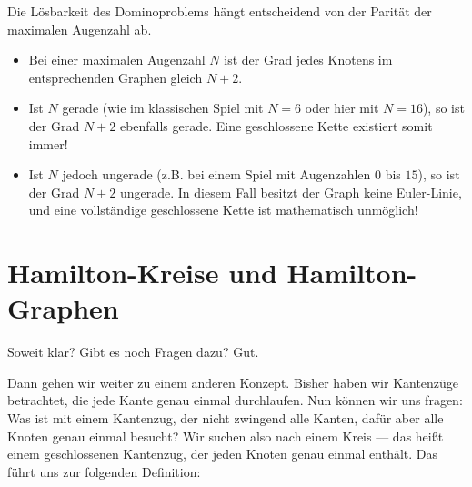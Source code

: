 \begin{didactic-insight}
Die Lösbarkeit des Dominoproblems hängt entscheidend von der Parität der maximalen Augenzahl ab. 
\begin{itemize}
    \item Bei einer maximalen Augenzahl $N$ ist der Grad jedes Knotens im entsprechenden Graphen gleich $N + 2$.
    \item Ist $N$ gerade (wie im klassischen Spiel mit $N=6$ oder hier mit $N=16$), so ist der Grad $N+2$ ebenfalls gerade. Eine geschlossene Kette existiert somit immer!
    \item Ist $N$ jedoch ungerade (z.B. bei einem Spiel mit Augenzahlen $0$ bis $15$), so ist der Grad $N+2$ ungerade. In diesem Fall besitzt der Graph keine Euler-Linie, und eine vollständige geschlossene Kette ist mathematisch unmöglich!
\end{itemize}
\end{didactic-insight}


\section{Hamilton-Kreise und Hamilton-Graphen}

\begin{spoken-clean}[00:31:34 - 00:32:29]
Soweit klar? Gibt es noch Fragen dazu? Gut. 

Dann gehen wir weiter zu einem anderen Konzept. Bisher haben wir Kantenzüge betrachtet, die jede Kante genau einmal durchlaufen. Nun können wir uns fragen: Was ist mit einem Kantenzug, der nicht zwingend alle Kanten, dafür aber alle Knoten genau einmal besucht? Wir suchen also nach einem Kreis --- das heißt einem geschlossenen Kantenzug, der jeden Knoten genau einmal enthält. Das führt uns zur folgenden Definition:
\end{spoken-clean}

\begin{math-stroke}
\end{math-stroke}

